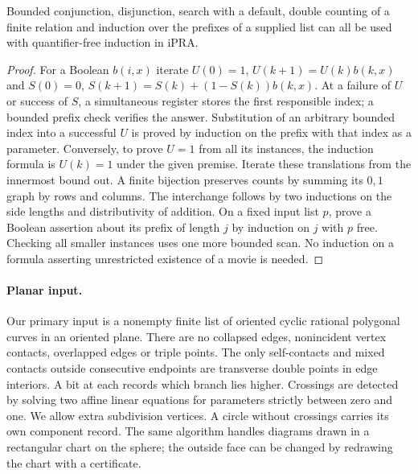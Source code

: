 \begin{lemma}\label{lem:interface}
Bounded conjunction, disjunction, search with a default, double counting of a finite relation and induction over the prefixes of a supplied list can all be used with quantifier-free induction in iPRA.
\end{lemma}
\begin{proof}
For a Boolean $b(i,x)$ iterate $U(0)=1$, $U(k+1)=U(k)b(k,x)$ and $S(0)=0$, $S(k+1)=S(k)+(1-S(k))b(k,x)$. At a failure of $U$ or success of $S$, a simultaneous register stores the first responsible index; a bounded prefix check verifies the answer. Substitution of an arbitrary bounded index into a successful $U$ is proved by induction on the prefix with that index as a parameter. Conversely, to prove $U=1$ from all its instances, the induction formula is $U(k)=1$ under the given premise. Iterate these translations from the innermost bound out. A finite bijection preserves counts by summing its $0,1$ graph by rows and columns. The interchange follows by two inductions on the side lengths and distributivity of addition. On a fixed input list $p$, prove a Boolean assertion about its prefix of length $j$ by induction on $j$ with $p$ free. Checking all smaller instances uses one more bounded scan. No induction on a formula asserting unrestricted existence of a movie is needed.
\end{proof}

\paragraph{Planar input.}
Our primary input is a nonempty finite list of oriented cyclic rational polygonal curves in an oriented plane. There are no collapsed edges, nonincident vertex contacts, overlapped edges or triple points. The only self-contacts and mixed contacts outside consecutive endpoints are transverse double points in edge interiors. A bit at each records which branch lies higher. Crossings are detected by solving two affine linear equations for parameters strictly between zero and one. We allow extra subdivision vertices. A circle without crossings carries its own component record. The same algorithm handles diagrams drawn in a rectangular chart on the sphere; the outside face can be changed by redrawing the chart with a certificate.

